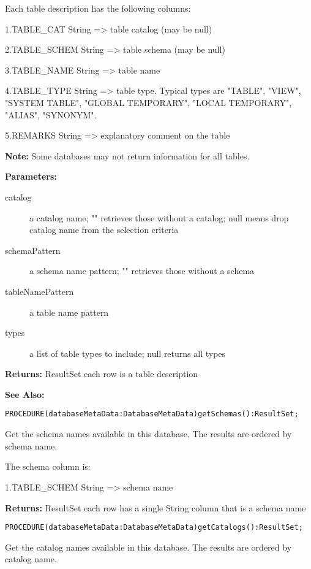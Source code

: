 Each table description has the following columns: 

1.TABLE\_CAT String => table catalog (may be null)

2.TABLE\_SCHEM String => table schema (may be null)

3.TABLE\_NAME String => table name

4.TABLE\_TYPE String => table type. Typical types are "TABLE", "VIEW", "SYSTEM TABLE", "GLOBAL TEMPORARY", "LOCAL TEMPORARY", "ALIAS", "SYNONYM".

5.REMARKS String => explanatory comment on the table 


{\bf Note: } Some databases may not return information for all tables. 

{\bf Parameters: }
\begin{description}
\item[catalog] a catalog name; "" retrieves those without a catalog; null means drop catalog name from the selection criteria 
\item[schemaPattern] a schema name pattern; "" retrieves those without a schema 
\item[tableNamePattern] a table name pattern 
\item[types] a list of table types to include; null returns all types 
\end{description}

{\bf Returns: } 
ResultSet each row is a table description 

{\bf See Also:} 



\verb'PROCEDURE(databaseMetaData:DatabaseMetaData)getSchemas():ResultSet;'






Get the schema names available in this database. The results are ordered by schema name. 

The schema column is: 

1.TABLE\_SCHEM String => schema name 


{\bf Returns: } 
ResultSet each row has a single String column that is a schema name 




\verb'PROCEDURE(databaseMetaData:DatabaseMetaData)getCatalogs():ResultSet;'






Get the catalog names available in this database. The results are ordered by catalog name. 

